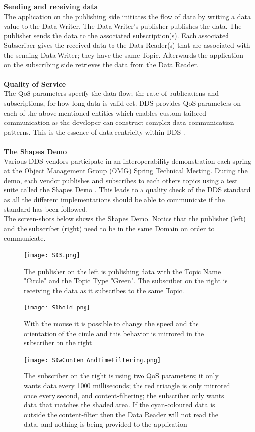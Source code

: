 \documentclass[Main]{subfiles}
\begin{document}
\textbf{Sending and receiving data}\\The application on the publishing side initiates the flow of data by writing a data value to the Data Writer. The Data Writer's publisher publishes the data. The publisher sends the data to the associated subscription(s). Each associated Subscriber gives the received data to the Data Reader(s) that are associated with the sending Data Writer; they have the same Topic. Afterwards the application on the subscribing side retrieves the data from the Data Reader.\\
\\
\textbf{Quality of Service}\\The QoS parameters specify the data flow; the rate of publications and subscriptions, for how long data is valid ect. DDS provides QoS parameters on each of the above-mentioned entities which enables custom tailored communication as the developer can construct complex data communication patterns. This is the essence of data centricity within DDS \cite{RTI} \cite{DDS-slides}.
\\
\\
\textbf{The Shapes Demo}\\Various DDS vendors participate in an interoperability demonstration each spring at the Object Management Group (OMG) Spring Technical Meeting. During the demo, each vendor publishes and subscribes to each others topics using a test suite called the Shapes Demo \cite{wiki-DDS}. This leads to a quality check of the DDS standard as all the different implementations should be able to communicate if the standard has been followed.\\The screen-shots below shows the Shapes Demo. Notice that the publisher (left) and the subscriber (right) need to be in the same Domain on order to communicate.
\\
\begin{figure}[H]
\centering
\texttt{[image: SD3.png]}
\caption{The publisher on the left is publishing data with the Topic Name "Circle" and the Topic Type "Green". The subscriber on the right is receiving the data as it subscribes to the same Topic.}
\end{figure}
\vspace{10 pt}
\begin{figure}[H]
\centering
\texttt{[image: SDhold.png]}
\caption{With the mouse it is possible to change the speed and the orientation of the circle and this behavior is mirrored in the subscriber on the right}
\end{figure}
\vspace{10 pt}
\begin{figure}[H]
\centering
\texttt{[image: SDwContentAndTimeFiltering.png]}
\caption{The subscriber on the right is using two QoS parameters; it only wants data every 1000 milliseconds; the red triangle is only mirrored once every second, and content-filtering; the subscriber only wants data that matches the shaded area. If the cyan-coloured data is outside the content-filter then the Data Reader will not read the data, and nothing is being provided to the application}
\end{figure}
\vspace{10 pt}
\end{document}
